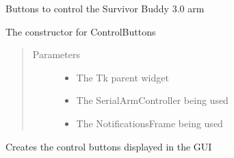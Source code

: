 \documentclass[letterpaper,10pt,english,openany,oneside]{sphinxmanual}
\begin{document}
\begin{fulllineitems}
\label{\detokenize{src/controlbuttons:ControlButtons.ControlButtons}}
Buttons to control the Survivor Buddy 3.0 arm

\begin{fulllineitems}
\label{\detokenize{src/controlbuttons:ControlButtons.ControlButtons.__init__}}
The constructor for ControlButtons
\begin{quote}\begin{description}
\item[{Parameters}] \leavevmode\begin{itemize}
\item {} 
 \textendash{} The Tk parent widget

\item {} 
 \textendash{} The SerialArmController being used

\item {} 
 \textendash{} The NotificationsFrame being used

\end{itemize}

\end{description}\end{quote}

\end{fulllineitems}


\begin{fulllineitems}
\label{\detokenize{src/controlbuttons:ControlButtons.ControlButtons.create_buttons}}
Creates the control buttons displayed in the GUI


\end{fulllineitems}
\end{fulllineitems}
\end{document}
